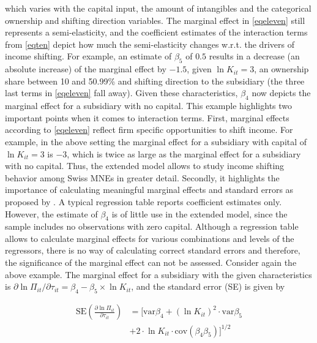 \documentclass[10pt,twocolumn,oneside,cmyk]{article}
\begin{document}
which varies with the capital input, the amount of intangibles and the categorical ownership and shifting direction variables. The marginal effect in \cref{eqeleven} still represents a semi-elasticity, and the coefficient estimates of the interaction terms from \cref{eqten} depict how much the semi-elasticity changes w.r.t. the drivers of income shifting. For example, an estimate of $\beta_5$ of $0.5$ results in a decrease (an absolute increase) of the marginal effect by $-1.5$, given $\ln K_{it}=3$, an ownership share between 10 and 50.99\% and shifting direction to the subsidiary (the three last terms in \cref{eqeleven} fall away). Given these characteristics, $\beta_4$ now depicts the marginal effect for a subsidiary with no capital. This example highlights two important points when it comes to interaction terms. First, marginal effects according to \cref{eqeleven} reflect firm specific opportunities to shift income. For example, in the above setting the marginal effect for a subsidiary with capital of $\ln K_{it} = 3$ is $-3$, which is twice as large as the marginal effect for a subsidiary with no capital. Thus, the extended model allows to study income shifting behavior among Swiss MNEs in greater detail. Secondly, it highlights the importance of calculating meaningful marginal effects and standard errors as proposed by \textcite[74]{brambor_understanding_2006}. A typical regression table reports coefficient estimates only. However, the estimate of $\beta_4$ is of little use in the extended model, since the sample includes no observations with zero capital. Although a regression table allows to calculate marginal effects for various combinations and levels of the regressors, there is no way of calculating correct standard errors and therefore, the significance of the marginal effect can not be assessed. Consider again the above example. The marginal effect for a subsidiary with the given characteristics is $\partial \ln \Pi_{it}/\partial \tau_{it}=\beta_4 - \beta_5 \times \ln K_{it}$, and the standard error (SE) is given by

\begin{equation}\label{eqtwelve}
 \begin{split}
  \text{SE}\left(\frac{\partial \ln \Pi_{it}}{\partial \tau_{it}}\right) &= [\text{var}\beta_4 + (\ln K_{it})^2 \cdot\text{var}\beta_5\\
&+2 \cdot \ln K_{it} \cdot \text{cov}(\beta_4 \beta_5)]^{1/2}
 \end{split}
\end{equation}
\end{document}
